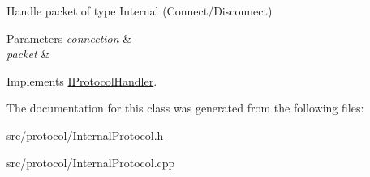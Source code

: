 Handle packet of type Internal (Connect/\-Disconnect) 


\begin{DoxyParams}{Parameters}
{\em connection} & \\
\hline
{\em packet} & \\
\hline
\end{DoxyParams}


Implements \hyperlink{class_i_protocol_handler_abcdcfa563b512a954b08bee298e6e1ed}{I\-Protocol\-Handler}.



The documentation for this class was generated from the following files\-:\begin{DoxyCompactItemize}
\item 
src/protocol/\hyperlink{_internal_protocol_8h}{Internal\-Protocol.\-h}\item 
src/protocol/Internal\-Protocol.\-cpp\end{DoxyCompactItemize}
